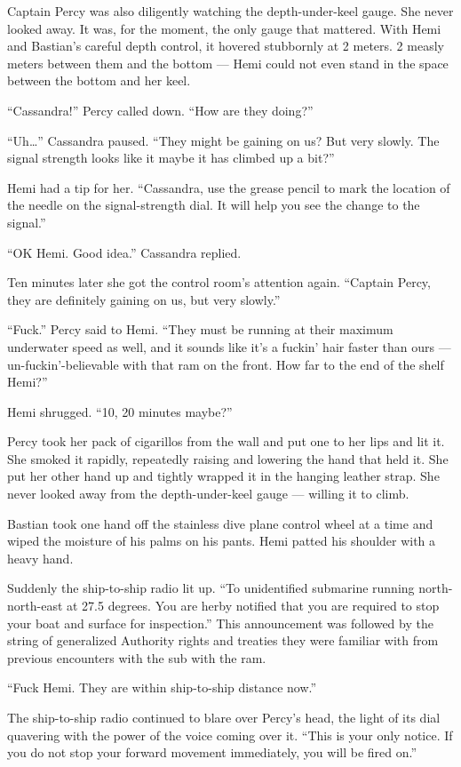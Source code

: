 \documentclass[]{scrbook}
\begin{document}
Captain Percy was also diligently watching the depth-under-keel gauge.
She never looked away. It was, for the moment, the only gauge that
mattered. With Hemi and Bastian's careful depth control, it hovered
stubbornly at 2 meters. 2 measly meters between them and the bottom ---
Hemi could not even stand in the space between the bottom and her keel.

``Cassandra!'' Percy called down. ``How are they doing?''

``Uh\ldots{}'' Cassandra paused. ``They might be gaining on us? But very
slowly. The signal strength looks like it maybe it has climbed up a
bit?''

Hemi had a tip for her. ``Cassandra, use the grease pencil to mark the
location of the needle on the signal-strength dial. It will help you see
the change to the signal.''

``OK Hemi. Good idea.'' Cassandra replied.

Ten minutes later she got the control room's attention again. ``Captain
Percy, they are definitely gaining on us, but very slowly.''

``Fuck.'' Percy said to Hemi. ``They must be running at their maximum
underwater speed as well, and it sounds like it's a fuckin' hair faster
than ours --- un-fuckin'-believable with that ram on the front. How far
to the end of the shelf Hemi?''

Hemi shrugged. ``10, 20 minutes maybe?''

Percy took her pack of cigarillos from the wall and put one to her lips
and lit it. She smoked it rapidly, repeatedly raising and lowering the
hand that held it. She put her other hand up and tightly wrapped it in
the hanging leather strap. She never looked away from the
depth-under-keel gauge --- willing it to climb.

Bastian took one hand off the stainless dive plane control wheel at a
time and wiped the moisture of his palms on his pants. Hemi patted his
shoulder with a heavy hand.

Suddenly the ship-to-ship radio lit up. ``To unidentified submarine
running north-north-east at 27.5 degrees. You are herby notified that
you are required to stop your boat and surface for inspection.'' This
announcement was followed by the string of generalized Authority rights
and treaties they were familiar with from previous encounters with the
sub with the ram.

``Fuck Hemi. They are within ship-to-ship distance now.''

The ship-to-ship radio continued to blare over Percy's head, the light
of its dial quavering with the power of the voice coming over it. ``This
is your only notice. If you do not stop your forward movement
immediately, you will be fired on.''
\end{document}
